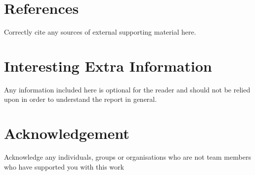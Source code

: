 \documentclass[11pt,journal]{discovery_paper}
\begin{document}
\section{References}
Correctly cite any sources of external supporting material here.



\appendices
\section{Interesting Extra Information}
Any information included here is optional for the reader and should not be relied upon in order to understand the report in general.

\section*{Acknowledgement}
Acknowledge any individuals, groups or organisations who are not team members who have supported you with this work



\end{document}
